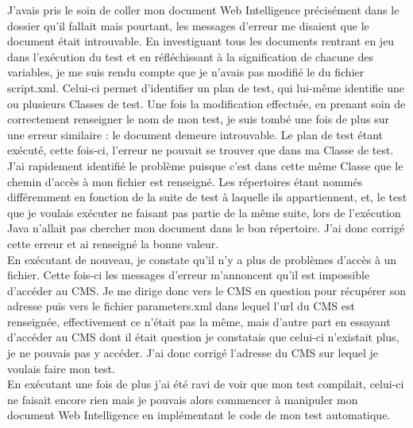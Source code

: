 J'avais pris le soin de coller mon document Web Intelligence pr\'{e}cis\'{e}ment dans le dossier qu'il fallait mais pourtant, les messages d'erreur me disaient que le document \'{e}tait introuvable. En investiguant tous les documents rentrant en jeu dans l'ex\'{e}cution du test et en r\'{e}fl\'{e}chissant \`{a} la signification de chacune des variables, je me suis rendu compte que je n'avais pas modifi\'{e} le  du fichier script.xml. Celui-ci permet d'identifier un plan de test, qui lui-m\^{e}me identifie une ou plusieurs \gls{Classe}s de test. Une fois la modification effectu\'{e}e, en prenant soin de correctement renseigner le nom de mon test, je suis tomb\'{e} une fois de plus sur une erreur similaire : le document demeure introuvable. Le plan de test \'{e}tant ex\'{e}cut\'{e}, cette fois-ci, l'erreur ne pouvait se trouver que dans ma \gls{Classe} de test. J'ai rapidement identifi\'{e} le probl\`{e}me puisque c'est dans cette m\^{e}me \gls{Classe} que le chemin d'acc\`{e}s \`{a} mon fichier est renseign\'{e}. Les r\'{e}pertoires \'{e}tant nomm\'{e}s diff\'{e}remment en fonction de la suite de test \`{a} laquelle ils appartiennent, et, le test que je voulais ex\'{e}cuter ne faisant pas partie de la m\^{e}me suite, lors de l'ex\'{e}cution \gls{Java} n'allait pas chercher mon document dans le bon r\'{e}pertoire. J'ai donc corrig\'{e} cette erreur et ai renseign\'{e} la bonne valeur.\\
En ex\'{e}cutant de nouveau, je constate qu'il n'y a plus de probl\`{e}mes d'acc\`{e}s \`{a} un fichier. Cette fois-ci les messages d'erreur m'annoncent qu'il est impossible d'acc\'{e}der au \gls{CMS}. Je me dirige donc vers le \gls{CMS} en question pour r\'{e}cup\'{e}rer son adresse puis vers le fichier parameters.xml dans lequel l'url du \gls{CMS} est renseign\'{e}e, effectivement ce n'\'{e}tait pas la m\^{e}me, mais d'autre part en essayant d'acc\'{e}der au \gls{CMS} dont il \'{e}tait question je constatais que celui-ci n'existait plus, je ne pouvais pas y acc\'{e}der. J'ai donc corrig\'{e} l'adresse du \gls{CMS} sur lequel je voulais faire mon test.\\
En ex\'{e}cutant une fois de plus j'ai \'{e}t\'{e} ravi de voir que mon test compilait, celui-ci ne faisait encore rien mais je pouvais alors commencer \`{a} manipuler mon document Web Intelligence en impl\'{e}mentant le code de mon test automatique.\\

